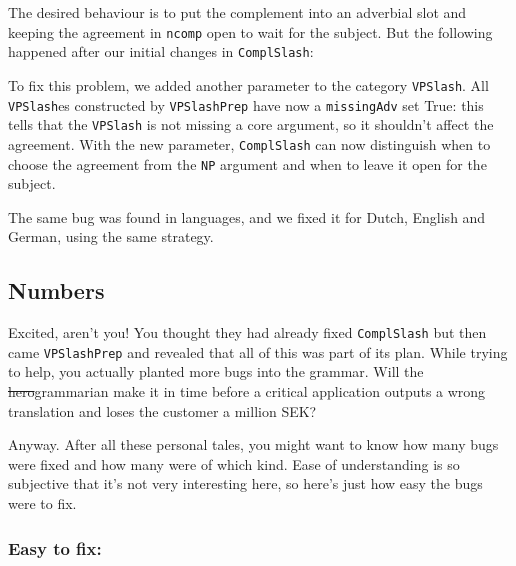 \begin{itemize}
  The desired behaviour is to put the complement into an adverbial slot
  and keeping the agreement in \texttt{ncomp} open to wait for the
  subject. But the following happened after our initial changes in
  \texttt{ComplSlash}:

\begin{EmptyItem}
\begin{Highlighting}[]
      \FunctionTok{=}  \NormalTok{;}
\FunctionTok{=} \OtherTok{=>}  \NormalTok{\} ; }
\end{Highlighting}
\end{EmptyItem}
\end{itemize}

To fix this problem, we added another parameter to the category
\texttt{VPSlash}. All \texttt{VPSlash}es constructed by
\texttt{VPSlashPrep} have now a \texttt{missingAdv} set True: this tells
that the \texttt{VPSlash} is not missing a core argument, so it
shouldn't affect the agreement. With the new parameter,
\texttt{ComplSlash} can now distinguish when to choose the agreement
from the \texttt{NP} argument and when to leave it open for the subject.

The same bug was found in languages, and we fixed it for Dutch, English
and German, using the same strategy.

\subsection{Numbers}\label{numbers}

Excited, aren't you! You thought they had already fixed
\texttt{ComplSlash} but then came \texttt{VPSlashPrep} and revealed that
all of this was part of its plan. While trying to help, you actually
planted more bugs into the grammar. Will the \sout{hero}grammarian make
it in time before a critical application outputs a wrong translation and
loses the customer a million SEK?

Anyway. After all these personal tales, you might want to know how many
bugs were fixed and how many were of which kind. Ease of understanding
is so subjective that it's not very interesting here, so here's just how
easy the bugs were to fix.

\subsubsection{Easy to fix:}\label{easy-to-fix}

